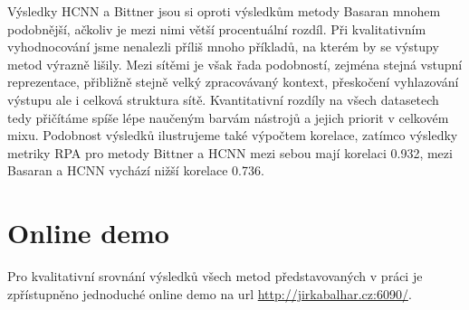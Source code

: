 Výsledky HCNN a Bittner jsou si oproti výsledkům metody Basaran mnohem podobnější, ačkoliv je mezi nimi větší procentuální rozdíl. Při kvalitativním vyhodnocování jsme nenalezli příliš mnoho příkladů, na kterém by se výstupy metod výrazně lišily. Mezi sítěmi je však řada podobností, zejména stejná vstupní reprezentace, přibližně stejně velký zpracovávaný kontext, přeskočení vyhlazování výstupu ale i celková struktura sítě. Kvantitativní rozdíly na všech datasetech tedy přičítáme spíše lépe naučeným barvám nástrojů a jejich priorit v celkovém mixu. Podobnost výsledků ilustrujeme také výpočtem korelace, zatímco výsledky metriky RPA pro metody Bittner a HCNN mezi sebou mají korelaci 0.932, mezi Basaran a HCNN vychází nižší korelace 0.736.

\section{Online demo}

Pro kvalitativní srovnání výsledků všech metod představovaných v práci je zpřístupněno jednoduché online demo na url \url{http://jirkabalhar.cz:6090/}. 








